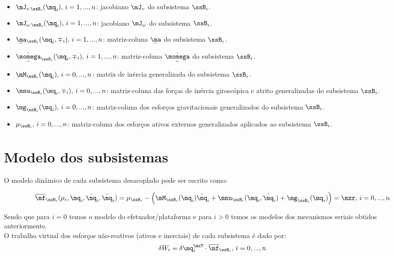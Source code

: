 \documentclass[]{politex}
\begin{document}
\begin{itemize}
\item $\mJ_{v\,\ssB_i}(\mq_i), \,i=1, ..., n$: jacobiano $\mJ_v$ do subsistema $\ssB_i$.
\item $\mJ_{\omega\,\ssB_i}(\mq_i), \,i=1, ..., n$: jacobiano $\mJ_\omega$ do subsistema $\ssB_i$.
\item $\underaccent{\sim}{\ma}_{\ssB_i}(\mq_i, \mp_i), \,i=1, ..., n$: matriz-coluna $\underaccent{\sim}{\ma}$ do subsistema $\ssB_i$.
\item $\underaccent{\sim}{\dot{\momega}}_{\ssB_i}(\mq_i, \mp_i), \,i=1, ..., n$: matriz-coluna $\underaccent{\sim}{\dot{\momega}}$ do subsistema $\ssB_i$.
\item $\mM_{\ssB_i}(\mq_i), \,i=0, ..., n$: matriz de in\'ercia generalizada do subsistema $\ssB_i$.
\item $\mnu_{\ssB_i}(\mq_i, \mp_i), \,i=0, ..., n$: matriz-coluna das forças de inércia girosc\'opica e atrito generalizadas do subsistema $\ssB_i$.
\item $\mg_{\ssB_i}(\mq_i), \,i=0, ..., n$: matriz-coluna dos esfor\c{c}os gravitacionais generalizados do subsistema $\ssB_i$.
\item $\mu_{\ssB_i}, \,i=0, ..., n$: matriz-coluna dos esfor\c{c}os ativos externos generalizados aplicados ao subsistema $\ssB_i$.
\end{itemize}

\section{Modelo dos subsistemas} 

O modelo dinâmico de cada subsistema desacoplado pode ser escrito como:

\begin{equation} \label{eq:ModeloDosSubsistemas}
\overline{\mf}_{\ssB_i}(\mu_i, \mq_i, \dot{\mq}_i, \ddot{\mq}_i) =  \mu_{\ssB_i} - \Big(\mM_{\ssB_i}(\mq_i) \ddot{\mq}_i + \mnu_{\ssB_i}(\mq_i,\dot{\mq}_i) + \mg_{\ssB_i}(\mq_i)\Big) = \mzr, \, i = 0,...,n
\end{equation}

Sendo que para $i=0$ temos o modelo do efetuador/plataforma e para $i>0$ temos os modelos dos mecanismos seriais obtidos anteriormente. \\


O trabalho virtual dos esforços não-reativos (ativos e inerciais) de cada subsistema é dado por:
\begin{equation}
\delta W_i = \delta \mq_i^\msT \cdot \overline{\mf}_{\ssB_i}, \, i = 0,...,n
\end{equation}
\end{document}
